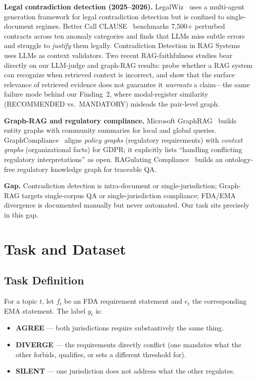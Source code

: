 \documentclass[sigconf]{acmart}
\begin{document}
\textbf{Legal contradiction detection (2025--2026).}
LegalWiz~\cite{legalwiz2025} uses a multi-agent generation framework for legal
contradiction detection but is confined to single-document regimes. Better Call
CLAUSE~\cite{betterclause2026} benchmarks 7,500+
perturbed contracts across ten anomaly categories and finds that LLMs miss
subtle errors and struggle to \textit{justify} them legally. Contradiction
Detection in RAG Systems~\cite{contradictionrag2025} uses LLMs as context
validators. Two recent RAG-faithfulness studies bear directly on our LLM-judge
and graph-RAG results: \citet{chen2026ragwrong} probe whether a RAG system can
recognize when retrieved context is incorrect, and \citet{qian2026evidenceforce}
show that the surface relevance of retrieved evidence does not guarantee it
\textit{warrants} a claim---the same failure mode behind our Finding~2, where
modal-register similarity (RECOMMENDED vs.\ MANDATORY) misleads the pair-level
graph.

\textbf{Graph-RAG and regulatory compliance.}
Microsoft GraphRAG~\cite{edge2024graphrag} builds entity graphs with community
summaries for local and global queries. GraphCompliance~\cite{graphcompliance2025}
aligns \textit{policy graphs} (regulatory requirements) with \textit{context
graphs} (organizational facts) for GDPR; it explicitly lists ``handling
conflicting regulatory interpretations'' as open. RAGulating
Compliance~\cite{ragulating2025} builds an ontology-free regulatory knowledge
graph for traceable QA.

\textbf{Gap.} Contradiction detection is intra-document or
single-jurisdiction; Graph-RAG targets single-corpus QA or
single-jurisdiction compliance; FDA/EMA divergence is documented manually but
never automated. Our task sits precisely in this gap.

\section{Task and Dataset}

\subsection{Task Definition}

For a topic $t$, let $f_t$ be an FDA requirement statement and $e_t$ the
corresponding EMA statement. The label $y_t$ is:
\begin{itemize}
\item \textbf{AGREE} --- both jurisdictions require substantively the same thing.
\item \textbf{DIVERGE} --- the requirements directly conflict (one mandates
  what the other forbids, qualifies, or sets a different threshold for).
\item \textbf{SILENT} --- one jurisdiction does not address what the other
  regulates.
\end{itemize}
\end{document}
